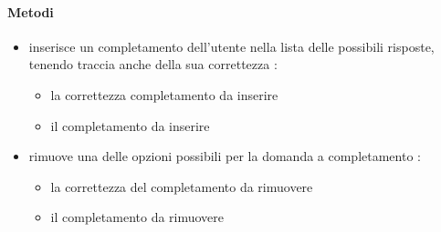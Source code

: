 \paragraph{Metodi}
\begin{itemize}
\item {}
\newline
inserisce un completamento dell'utente nella lista delle possibili risposte, tenendo traccia anche della sua correttezza
\newline
{} :
\begin{itemize}
\item {}
\newline
la correttezza completamento da inserire
\item {}
\newline
il completamento da inserire
\end{itemize}
\item {}
\newline
rimuove una delle opzioni possibili per la domanda a completamento
\newline
{} :
\begin{itemize}
\item {}
\newline
la correttezza del completamento da rimuovere
\item {}
\newline
il completamento da rimuovere
\end{itemize}
\end{itemize}

